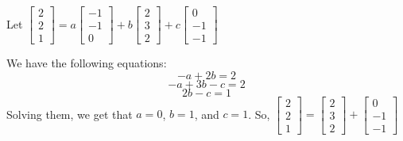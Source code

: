 \begin{enumerate}
{    Let $\begin{bmatrix}2 \\ 2 \\ 1\end{bmatrix} = a\begin{bmatrix}-1 \\ -1 \\ 0\end{bmatrix} + b\begin{bmatrix}2 \\ 3 \\ 2\end{bmatrix} + c\begin{bmatrix}0 \\ -1 \\ -1\end{bmatrix}$
    
    We have the following equations:
    $$-a + 2b = 2$$
    $$-a + 3b - c = 2$$
    $$2b - c = 1$$
    Solving them, we get that $a = 0$, $b = 1$, and $c = 1$. So, $\begin{bmatrix}2 \\ 2 \\ 1\end{bmatrix} = \begin{bmatrix}2 \\ 3 \\ 2\end{bmatrix} + \begin{bmatrix}0 \\ -1 \\ -1\end{bmatrix}$ 
    
}
\end{enumerate}
